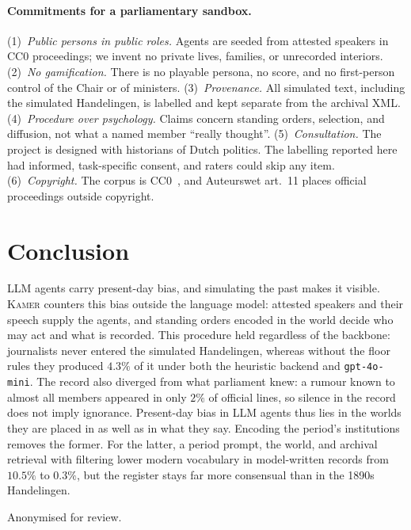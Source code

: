 \documentclass[sigconf,review,anonymous]{acmart}
\newcommand{\sys}{\textsc{Kamer}}
\begin{document}
\paragraph{Commitments for a parliamentary sandbox.}
(1)~\emph{Public persons in public roles.} Agents are seeded from
attested speakers in CC0 proceedings; we invent no private lives,
families, or unrecorded interiors.
(2)~\emph{No gamification.} There is no playable persona, no score, and
no first-person control of the Chair or of ministers.
(3)~\emph{Provenance.} All simulated text, including the simulated
Handelingen, is labelled and kept separate from the archival XML.
(4)~\emph{Procedure over psychology.} Claims concern standing orders,
selection, and diffusion, not what a named member ``really thought''.
(5)~\emph{Consultation.} The project is designed with historians of
Dutch politics. The labelling reported here had informed, task-specific
consent, and raters could skip any item.
(6)~\emph{Copyright.} The corpus is CC0~\cite{marx2012dutchparl}, and
Auteurswet art.~11 places official proceedings outside copyright.

\section{Conclusion}
\label{sec:conclusion}

LLM agents carry present-day bias, and simulating the past makes it
visible. \sys{} counters this bias outside the language model: attested
speakers and their speech supply the agents, and standing orders encoded
in the world decide who may act and what is recorded. This procedure held
regardless of the backbone: journalists never entered the simulated
Handelingen, whereas without the floor rules they produced $4.3\%$ of it
under both the heuristic backend and \texttt{gpt-4o-mini}. The record also
diverged from what parliament knew: a rumour known to almost all members
appeared in only $2\%$ of official lines, so silence in the record does
not imply ignorance. Present-day bias in LLM agents thus lies in the worlds they
are placed in as well as in what they say. Encoding the period's
institutions removes the former. For the latter, a period prompt, the
world, and archival retrieval with filtering lower modern vocabulary in
model-written records from $10.5\%$ to $0.3\%$, but the register stays far
more consensual than in the 1890s Handelingen.

\begin{acks}
Anonymised for review.
\end{acks}
\end{document}
